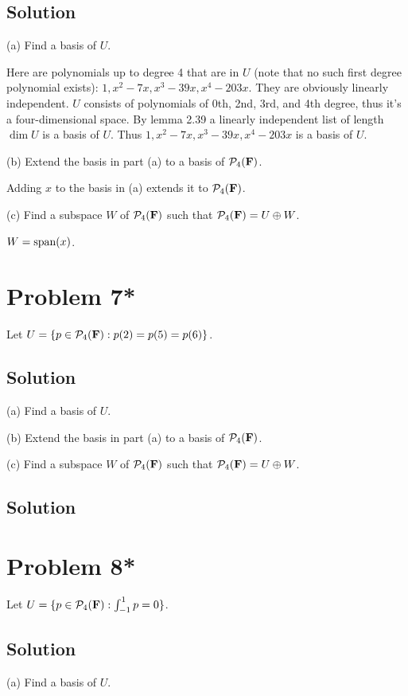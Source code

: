 \documentclass{article}
\begin{document}
\subsection*{Solution}
(a) Find a basis of $U$.

Here are polynomials up to degree 4 that are in $U$ (note that no such first degree polynomial exists): $1, x^2-7x, x^3-39x, x^4-203x$. They are obviously linearly independent. $U$ consists of polynomials of 0th, 2nd, 3rd, and 4th degree, thus it's a four-dimensional space. By lemma 2.39 a linearly independent list of length $\dim U$ is a basis of $U$. Thus $1, x^2-7x, x^3-39x, x^4-203x$ is a basis of $U$.

\vs

(b) Extend the basis in part (a) to a basis of $\mathcal{P}_4(\mathbf{F})$.

Adding $x$ to the basis in (a) extends it to $\mathcal{P}_4(\mathbf{F})$.

\vs

(c) Find a subspace $W$ of $\mathcal{P}_4(\mathbf{F})$ such that $\mathcal{P}_4(\mathbf{F})=U\oplus W$.

$W=\text{span}(x)$.

\section*{Problem 7*}
Let $U=\{p\in\mathcal{P}_4(\mathbf{F}):p(2)=p(5)=p(6)\}$.

\subsection*{Solution}
(a) Find a basis of $U$.

\vs

(b) Extend the basis in part (a) to a basis of $\mathcal{P}_4(\mathbf{F})$.

\vs

(c) Find a subspace $W$ of $\mathcal{P}_4(\mathbf{F})$ such that $\mathcal{P}_4(\mathbf{F})=U\oplus W$.

\subsection*{Solution}

\section*{Problem 8*}
Let $U=\{p\in\mathcal{P}_4(\mathbf{F}):\int_{-1}^{1}{p=0}\}$.

\subsection*{Solution}
(a) Find a basis of $U$.
\end{document}
